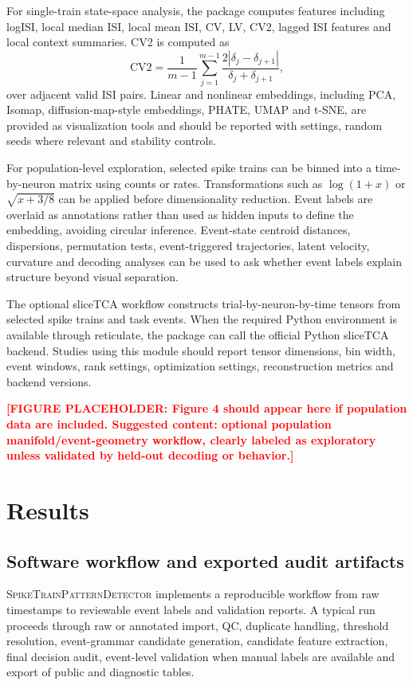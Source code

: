 \documentclass[pdflatex,sn-apa]{sn-jnl}
\newcommand{\stpd}{\textsc{SpikeTrainPatternDetector}}
\newcommand{\TODOFIG}[1]{\par\medskip\noindent\textbf{\textcolor{red}{[FIGURE PLACEHOLDER: #1]}}\par\medskip}
\begin{document}
For single-train state-space analysis, the package computes features including logISI, local median ISI, local mean ISI, CV, LV, CV2, lagged ISI features and local context summaries. CV2 is computed as
\begin{equation}
    \mathrm{CV2}
    =
    \frac{1}{m-1}
    \sum_{j=1}^{m-1}
    \frac{2|\delta_j-\delta_{j+1}|}{\delta_j+\delta_{j+1}},
\end{equation}
over adjacent valid ISI pairs. Linear and nonlinear embeddings, including PCA, Isomap, diffusion-map-style embeddings, PHATE, UMAP and t-SNE, are provided as visualization tools and should be reported with settings, random seeds where relevant and stability controls.

For population-level exploration, selected spike trains can be binned into a time-by-neuron matrix using counts or rates. Transformations such as $\log(1+x)$ or $\sqrt{x+3/8}$ can be applied before dimensionality reduction. Event labels are overlaid as annotations rather than used as hidden inputs to define the embedding, avoiding circular inference. Event-state centroid distances, dispersions, permutation tests, event-triggered trajectories, latent velocity, curvature and decoding analyses can be used to ask whether event labels explain structure beyond visual separation.

The optional sliceTCA workflow constructs trial-by-neuron-by-time tensors from selected spike trains and task events. When the required Python environment is available through reticulate, the package can call the official Python sliceTCA backend. Studies using this module should report tensor dimensions, bin width, event windows, rank settings, optimization settings, reconstruction metrics and backend versions.

\TODOFIG{Figure 4 should appear here if population data are included. Suggested content: optional population manifold/event-geometry workflow, clearly labeled as exploratory unless validated by held-out decoding or behavior.}

\section{Results}

\subsection{Software workflow and exported audit artifacts}

\stpd{} implements a reproducible workflow from raw timestamps to reviewable event labels and validation reports. A typical run proceeds through raw or annotated import, QC, duplicate handling, threshold resolution, event-grammar candidate generation, candidate feature extraction, final decision audit, event-level validation when manual labels are available and export of public and diagnostic tables.
\end{document}
